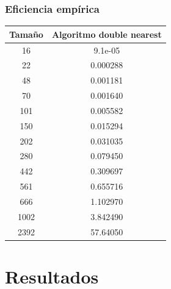 \documentclass[a4]{article}
\begin{document}
\subsubsection{Eficiencia empírica}

\begin{tabular}{|c|c|} \hline
\textbf{Tamaño}& 
\textbf{Algoritmo double nearest}
  \\ \hline
     16      & 9.1e-05   \\
     22      & 0.000288  \\
     48      & 0.001181  \\
     70      & 0.001640  \\
     101     & 0.005582            \\
     150     & 0.015294  \\
     202     & 0.031035  \\
     280     & 0.079450    \\
     442     & 0.309697    \\
     561     & 0.655716  \\
     666     & 1.102970       \\
     1002    & 3.842490  \\
     2392    & 57.64050   \\
\hline
\end{tabular}

\begin{figure}[H]
  \centering
{}
\end{figure}



\section{Resultados}
\end{document}

